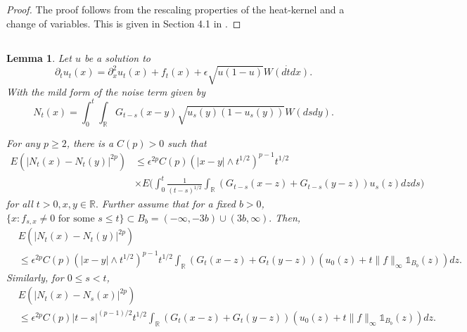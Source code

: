 \documentclass[12pt,a4paper]{amsart}
\numberwithin{equation}{section}
\theoremstyle{plain}
\newtheorem{lemma}[theorem]{Lemma}
\theoremstyle{remark}
\newcommand{\e}{\epsilon}
\newcommand{\R}{\mathbb{R}}
\newcommand{\p}{\partial}
\begin{document}
\begin{proof}
The proof follows from the rescaling properties of the heat-kernel and a change of variables. This is given in Section 4.1 in \cite{MuellerMytnikRyzhik2019TheSpeed}.
\end{proof}

\subsection{}

\begin{lemma}\label{Lemma:BDG}
Let $u$ be a solution to 
\[
\p_t u_t(x) = \p_{x}^2u_t(x) + f_t(x) + \e\sqrt{u(1-u)}\dot{W(dtdx).}
\]
With the mild form of the noise term given by \[
N_t(x) = \int_0^t\int_\R G_{t - s}(x - y)\sqrt{u_s(y)(1-u_s(y))}W(dsdy).
\]

For any  $p \geq 2$, there is a $C(p) > 0$ such that
\begin{align*}
E(|N_t(x) - N_t(y)|^{2p}) &\leq  \e^{2p}C(p)(|x - y| \land t^{1/2})^{p-1}t^{1/2}\\
&\times E\Big(\int_0^t\frac{1}{(t - s)^{1/2}}\int_\R (G_{t - s}(x - z) + G_{t - s}(y - z))u_s(z)dzds\Big)
\end{align*}
for all $t > 0, x, y \in \R.$
Further assume that for a fixed $b > 0$, $\{x : f_{s, x} \neq 0 \text{ for some } s \leq t\} \subset B_b = (-\infty, -3b) \cup (3b, \infty).$
Then,
\begin{align}
&E(|N_t(x) - N_t(y)|^{2p})\\
&\leq \e^{2p}C(p)(|x - y| \land t^{1/2})^{p-1}t^{1/2}\int_\R(G_t(x - z) + G_t(y - z))(u_0(z) + t\|f\|_\infty \mathds{1}_{B_b}(z))dz.
\end{align}
Similarly, for $0 \leq s < t$,
\begin{align}
&E(|N_t(x) - N_s(x)|^{2p})\\
&\leq \e^{2p}C(p)|t - s|^{(p-1)/2}t^{1/2}\int_\R(G_t(x - z) + G_t(y - z))(u_0(z) + t\|f\|_\infty \mathds{1}_{B_b}(z))dz.
\end{align}

\end{lemma}
\end{document}
